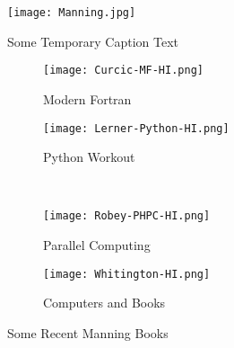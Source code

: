\documentclass[a4paper,twoside,openany]{book}
\begin{document}
\begin{spacing}{1.5}
		\begin{figure}[h]
			\centering
			\texttt{[image: Manning.jpg]}
			\caption{\centering Some Temporary Caption Text}
		\end{figure}				
		
		\vspace{0.5cm}
		
		
		\begin{figure}[h]
    		\centering 
		    \begin{subfigure}[b]{0.3\textwidth}
		        \centering
		        \texttt{[image: Curcic-MF-HI.png]}
		        \caption{\centering Modern Fortran}
		    \end{subfigure}
		    \begin{subfigure}[b]{0.3\textwidth}
		        \centering
		        \texttt{[image: Lerner-Python-HI.png]}
		        \caption{\centering Python Workout}
		    \end{subfigure}
		    \\[10pt]
		    \begin{subfigure}[b]{0.3\textwidth}
		        \centering
		        \texttt{[image: Robey-PHPC-HI.png]}
		        \caption{\centering Parallel Computing}
		    \end{subfigure}
		    \begin{subfigure}[b]{0.3\textwidth}
		        \centering
		        \texttt{[image: Whitington-HI.png]}
		        \caption{\centering Computers and Books}
		    \end{subfigure}
		    \caption{\centering Some Recent Manning Books}
		\end{figure}		
		
		\kant[1-2] 
		
		\vspace{0.5cm}
		
		

\end{spacing}
\end{document}

